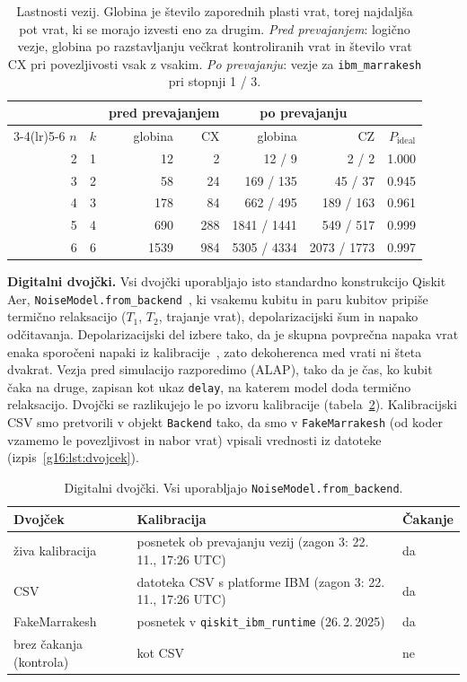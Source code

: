 \begin{table}[htbp]
\caption{Lastnosti vezij. Globina je število zaporednih plasti vrat, torej najdaljša pot vrat, ki se morajo izvesti eno za drugim. \emph{Pred prevajanjem}: logično vezje, globina po razstavljanju večkrat kontroliranih vrat in število vrat CX pri povezljivosti vsak z vsakim. \emph{Po prevajanju}: vezje za \texttt{ibm\_marrakesh} pri stopnji 1 / 3.}
\label{g16:tab:vezja}
\centering
\begin{tabular}{rrrrrrr}
\toprule
 & & \multicolumn{2}{c}{pred prevajanjem} & \multicolumn{2}{c}{po prevajanju} & \\
\cmidrule(lr){3-4}\cmidrule(lr){5-6}
$n$ & $k$ & globina & CX & globina & CZ & $P_\mathrm{ideal}$ \\
\midrule
2 & 1 & 12 & 2 & 12 / 9 & 2 / 2 & \num{1,000} \\
3 & 2 & 58 & 24 & 169 / 135 & 45 / 37 & \num{0,945} \\
4 & 3 & 178 & 84 & 662 / 495 & 189 / 163 & \num{0,961} \\
5 & 4 & 690 & 288 & \num{1841} / \num{1441} & 549 / 517 & \num{0,999} \\
6 & 6 & \num{1539} & 984 & \num{5305} / \num{4334} & \num{2073} / \num{1773} & \num{0,997} \\
\bottomrule
\end{tabular}
\end{table}

\textbf{Digitalni dvojčki.} Vsi dvojčki uporabljajo isto standardno konstrukcijo Qiskit Aer, \texttt{NoiseModel.from\_backend}~\cite{g16:aer_noisemodel}, ki vsakemu kubitu in paru kubitov pripiše termično relaksacijo ($T_1$, $T_2$, trajanje vrat), depolarizacijski šum in napako odčitavanja. Depolarizacijski del izbere tako, da je skupna povprečna napaka vrat enaka sporočeni napaki iz kalibracije~\cite{g16:magesan2011}, zato dekoherenca med vrati ni šteta dvakrat. Vezja pred simulacijo razporedimo (ALAP), tako da je čas, ko kubit čaka na druge, zapisan kot ukaz \texttt{delay}, na katerem model doda termično relaksacijo. Dvojčki se razlikujejo le po izvoru kalibracije (tabela~\ref{g16:tab:dvojcki}). Kalibracijski CSV smo pretvorili v objekt \texttt{Backend} tako, da smo v \texttt{FakeMarrakesh} (od koder vzamemo le povezljivost in nabor vrat) vpisali vrednosti iz datoteke (izpis~\ref{g16:lst:dvojcek}).

\begin{table}[htbp]
\caption{Digitalni dvojčki. Vsi uporabljajo \texttt{NoiseModel.from\_backend}.}
\label{g16:tab:dvojcki}
\centering
\begin{tabular}{lll}
\toprule
Dvojček & Kalibracija & Čakanje \\
\midrule
živa kalibracija & posnetek ob prevajanju vezij (zagon 3: 22.\,11., 17:26 UTC) & da \\
CSV & datoteka CSV s platforme IBM (zagon 3: 22.\,11., 17:26 UTC) & da \\
FakeMarrakesh & posnetek v \texttt{qiskit\_ibm\_runtime} (26.\,2.\,2025) & da \\
brez čakanja (kontrola) & kot CSV & ne \\
\bottomrule
\end{tabular}
\end{table}

